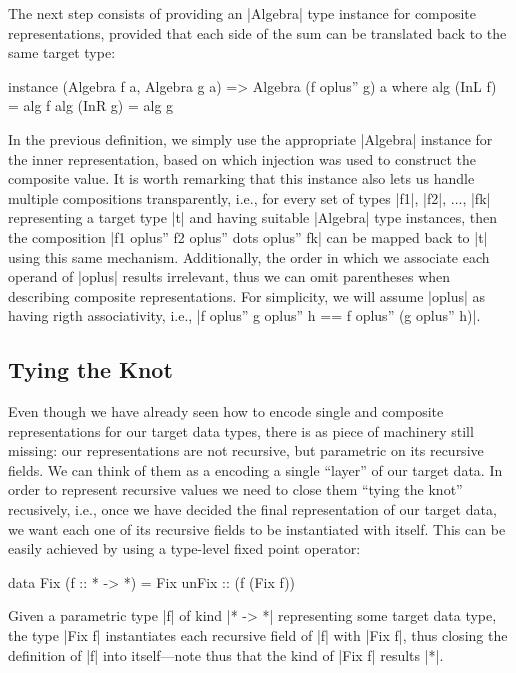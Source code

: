 The next step consists of providing an |Algebra| type instance for composite
representations, provided that each side of the sum can be translated back to
the same target type:

\begin{code}
instance (Algebra f a, Algebra g a) => Algebra (f oplus'' g) a
  where  alg (InL f) = alg f
         alg (InR g) = alg g
\end{code}

In the previous definition, we simply use the appropriate |Algebra| instance for
the inner representation, based on which injection was used to construct the
composite value.
%
It is worth remarking that this instance also lets us handle multiple
compositions transparently, i.e., for every set of types |f1|, |f2|, ..., |fk|
representing a target type |t| and having suitable |Algebra| type instances,
then the composition |f1 oplus'' f2 oplus'' dots oplus'' fk| can be mapped back
to |t| using this same mechanism.
%
Additionally, the order in which we associate each operand of |oplus| results
irrelevant, thus we can omit parentheses when describing composite
representations.
%
For simplicity, we will assume |oplus| as having rigth associativity, i.e., |f
oplus'' g oplus'' h == f oplus'' (g oplus'' h)|.


%
\subsection{Tying the Knot}

Even though we have already seen how to encode single and composite
representations for our target data types, there is as piece of machinery still
missing: our representations are not recursive, but parametric on its recursive
fields.
%
We can think of them as a encoding a single ``layer'' of our target data.
%
In order to represent recursive values we need to close them ``tying the knot''
recusively, i.e., once we have decided the final representation of our target
data, we want each one of its recursive fields to be instantiated with itself.
%
This can be easily achieved by using a type-level fixed point operator:

\begin{code}
data Fix (f :: * -> *) = Fix { unFix :: (f (Fix f)) }
\end{code}
%
Given a parametric type |f| of kind |* -> *| representing some target data type,
the type |Fix f| instantiates each recursive field of |f| with |Fix f|, thus
closing the definition of |f| into itself---note thus that the kind of |Fix f|
results |*|.

